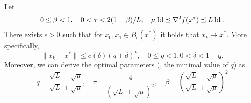 \begin{theorem}
    Let 
    \begin{equation}
        0\leq \beta <1, \quad 0<\tau <2(1+\beta)/L,\quad \mu \operatorname{\mathrm{Id}}\preceq \nabla^2 f(x^*)\preceq L\operatorname{\mathrm{Id}}.
    \end{equation}
    There exists $\epsilon>0$ such that for $x_0,x_1\in B_\epsilon(x^*)$ it holds that $x_k\rightarrow x^*$. More specifically, 
    \begin{equation}
        \|x_k-x^*\|\leq c(\delta)(q+\delta)^k,\quad 0\leq q< 1, 0<\delta<1-q.
    \end{equation}
    Moreover, we can derive the optimal parameters (\ie, the minimal value of $q$) as
    \begin{equation}
        q = \frac{\sqrt{L}-\sqrt{\mu}}{\sqrt{L}+\sqrt{\mu}},
        \quad \tau = \frac{4}{(\sqrt{L} + \sqrt{\mu})^2}
        ,\quad \beta = \left(\frac{\sqrt{L}-\sqrt{\mu}}{\sqrt{L}+\sqrt{\mu}}\right)^2
    \end{equation}
\end{theorem}
